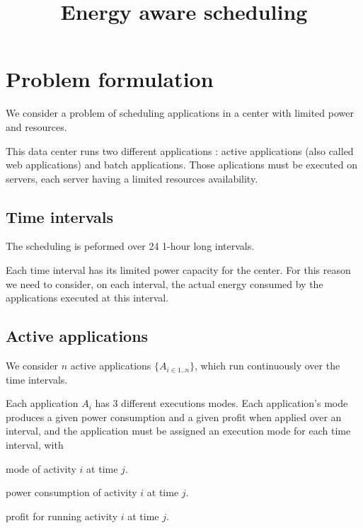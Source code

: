 \documentclass[a4paper]{article}
\begin{document}
\title{Energy aware scheduling}

\maketitle

\section{Problem formulation}

We consider a problem of scheduling applications in a center with limited power and resources.

This data center runs two different applications : active applications (also called web applications) and batch applications.
Those aplications must be executed on servers, each server having a limited resources availability.

\subsection{Time intervals}

The scheduling is peformed over 24 1-hour long intervals.

Each time interval has its limited power capacity for the center. For this reason we need to consider, on each interval, the actual energy consumed by the applications executed at this interval.

\subsection{Active applications}

We consider $n$ active applications $\{A_{i\in 1..n}\}$, which run continuously over the time intervals.

Each application $A_i$ has 3 different executions modes. Each application's mode produces a given power consumption and a given profit when applied over an interval, and the application must be assigned an execution mode for each time interval, with
\begin{description}[labelwidth=4em,align=left,labelindent=2em]
 \item[$M_{i,j} \in 1..3$] mode of activity $i$ at time $j$.
 \item[$Ea_{i,j} \in 0..1000$] power consumption of activity $i$ at time $j$.
 \item[$Pa_{i,j} \in 0..1000$] profit for running activity $i$ at time $j$.
\end{description}
\end{document}
